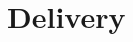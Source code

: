 \ifx\mainfile\undefined

\setcounter{chapter}{5} %
\fi

\cleardoublepage
\chapter{Delivery}
\label{chap:delivery}

\ifx\mainfile\undefined

\fi

